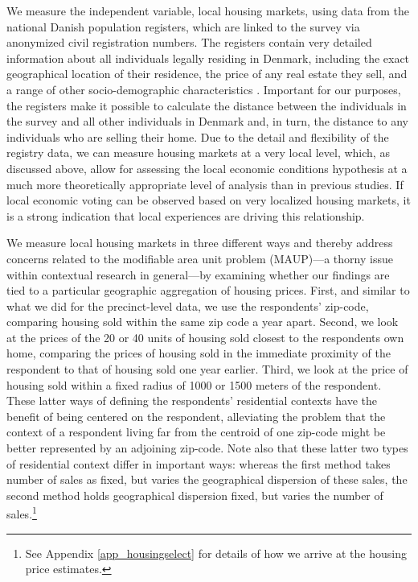 \documentclass[12pt,a4paper]{article}
\begin{document}
	We measure the independent variable, local housing markets, using data from the national Danish population registers, which are linked to the survey via anonymized civil registration numbers. The registers contain very detailed information about all individuals legally residing in Denmark, including the exact geographical location of their residence, the price of any real estate they sell, and a range of other socio-demographic characteristics \citep{thygesen2011introduction}. Important for our purposes, the registers make it possible to calculate the distance between the individuals in the survey and all other individuals in Denmark and, in turn, the distance to any individuals who are selling their home. Due to the detail and flexibility of the registry data, we can measure housing markets at a very local level, which, as discussed above,  allow for assessing the local economic conditions hypothesis at a much more theoretically appropriate level of analysis than in previous studies. If local economic voting can be observed based on very localized housing markets, it is a strong indication that local experiences are driving this relationship. 
	
	We measure local housing markets in three different ways and thereby address concerns related to the modifiable area unit problem (MAUP)—a thorny issue within contextual research in general—by examining whether our findings are tied to a particular geographic aggregation of housing prices. First, and similar to what we did for the precinct-level data, we use the respondents’ zip-code, comparing housing sold within the same zip code a year apart. Second, we look at the prices of the 20 or 40 units of housing sold closest to the respondents own home, comparing the prices of housing sold in the immediate proximity of the respondent to that of housing sold one year earlier. Third, we look at the price of housing sold within a fixed radius of 1000 or 1500 meters of the respondent. These latter ways of defining the respondents’ residential contexts have the benefit of being centered on the respondent, alleviating the problem that the context of a respondent living far from the centroid of one zip-code might be better represented by an adjoining zip-code. Note also that these latter two types of residential context differ in important ways: whereas the first method takes number of sales as fixed, but varies the geographical dispersion of these sales, the second method holds geographical dispersion fixed, but varies the number of sales.\footnote{See Appendix \ref{app_housingselect} for details of how we arrive at the housing price estimates.}
	
\end{document}
